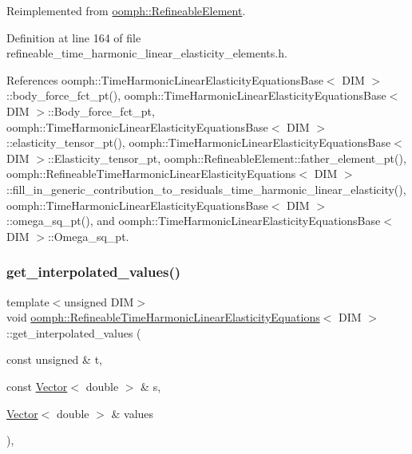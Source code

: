 Reimplemented from \hyperlink{classoomph_1_1RefineableElement_a26628ce36dfad028686adeb4694a9ef3}{oomph\+::\+Refineable\+Element}.



Definition at line 164 of file refineable\+\_\+time\+\_\+harmonic\+\_\+linear\+\_\+elasticity\+\_\+elements.\+h.



References oomph\+::\+Time\+Harmonic\+Linear\+Elasticity\+Equations\+Base$<$ D\+I\+M $>$\+::body\+\_\+force\+\_\+fct\+\_\+pt(), oomph\+::\+Time\+Harmonic\+Linear\+Elasticity\+Equations\+Base$<$ D\+I\+M $>$\+::\+Body\+\_\+force\+\_\+fct\+\_\+pt, oomph\+::\+Time\+Harmonic\+Linear\+Elasticity\+Equations\+Base$<$ D\+I\+M $>$\+::elasticity\+\_\+tensor\+\_\+pt(), oomph\+::\+Time\+Harmonic\+Linear\+Elasticity\+Equations\+Base$<$ D\+I\+M $>$\+::\+Elasticity\+\_\+tensor\+\_\+pt, oomph\+::\+Refineable\+Element\+::father\+\_\+element\+\_\+pt(), oomph\+::\+Refineable\+Time\+Harmonic\+Linear\+Elasticity\+Equations$<$ D\+I\+M $>$\+::fill\+\_\+in\+\_\+generic\+\_\+contribution\+\_\+to\+\_\+residuals\+\_\+time\+\_\+harmonic\+\_\+linear\+\_\+elasticity(), oomph\+::\+Time\+Harmonic\+Linear\+Elasticity\+Equations\+Base$<$ D\+I\+M $>$\+::omega\+\_\+sq\+\_\+pt(), and oomph\+::\+Time\+Harmonic\+Linear\+Elasticity\+Equations\+Base$<$ D\+I\+M $>$\+::\+Omega\+\_\+sq\+\_\+pt.

\mbox{\label{classoomph_1_1RefineableTimeHarmonicLinearElasticityEquations_a6e7ba2975f3e6023aebdb877ab0bb7ec}} 
\subsubsection{\texorpdfstring{get\+\_\+interpolated\+\_\+values()}{get\_interpolated\_values()}\hspace{0.1cm}{\footnotesize\ttfamily [1/2]}}
{\footnotesize\ttfamily template$<$unsigned D\+IM$>$ \\
void \hyperlink{classoomph_1_1RefineableTimeHarmonicLinearElasticityEquations}{oomph\+::\+Refineable\+Time\+Harmonic\+Linear\+Elasticity\+Equations}$<$ D\+IM $>$\+::get\+\_\+interpolated\+\_\+values (\begin{DoxyParamCaption}\item[{const unsigned \&}]{t,  }\item[{const \hyperlink{classoomph_1_1Vector}{Vector}$<$ double $>$ \&}]{s,  }\item[{\hyperlink{classoomph_1_1Vector}{Vector}$<$ double $>$ \&}]{values }\end{DoxyParamCaption})\hspace{0.3cm}{\ttfamily [inline]}, {\ttfamily [virtual]}}



